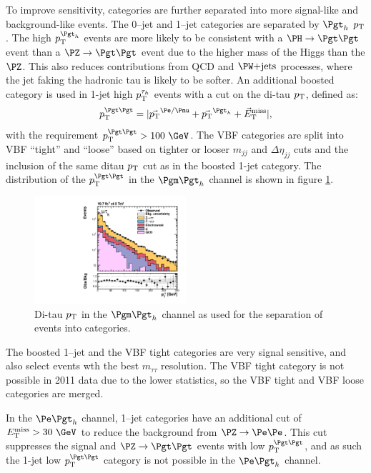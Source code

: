 To improve sensitivity, categories are further separated into more signal-like
and background-like events. The 0--jet and 1--jet categories are separated by
$\Pgth$ $p_{\mathrm{T}}$. The high $\pt^{\Pgth}$ events are more likely to be
consistent with a $\HToTauTau$ event than a $\ZToTauTau$ event due to the higher
mass of the Higgs than the $\PZ$. This also reduces contributions from \ac{QCD}
and $\WJets$ processes, where the jet faking the hadronic tau is likely to be
softer. An additional boosted category is used in 1-jet high $p_{\mathrm{T}}^{\tau_{h}}$
events with a cut on the di-tau $p_{\mathrm{T}}$, defined as:
\begin{equation}
\pt^{\Pgt\Pgt} = |\vec{\pt}^{\Pe/\Pmu} + \vec{\pt}^{\Pgth}+\vecMET|,
\end{equation}
with the requirement $\pt^{\Pgt\Pgt}>100~\GeV$. The VBF categories are split into VBF
``tight'' and ``loose'' based on tighter or looser $m_{jj}$ and
$\Delta\eta_{jj}$ cuts and the inclusion of the same ditau $p_{\mathrm{T}}$ cut as in the
boosted 1-jet category. The distribution of the $\pt^{\Pgt\Pgt}$ in the
$\mutau$ channel is shown in figure \ref{fig:ditaupt}. 

\begin{figure}[htb]
\begin{center}
    \includegraphics[width=0.5\textwidth]
      {plots/htt-sm/pt_tt_inclusive_mt_2012_log.pdf}
\end{center}
\caption{
 Di-tau $p_{\mathrm{T}}$ in the $\mutau$ channel as used for the separation of events into
 categories. 
}
\label{fig:ditaupt}
\end{figure}

The boosted 1--jet and the VBF tight categories are very 
signal sensitive, and also select events wth the best $m_{\tau\tau}$ resolution.
The VBF tight category is not possible in 2011 data due to the lower statistics,
so the VBF tight and VBF loose categories are merged. 

In the $\etau$ channel, 1--jet categories have an additional cut of $\MET >
30~\GeV$ to reduce the background from $\PZ\to\Pe\Pe$. This cut suppresses the
signal and $\ZToTauTau$ events with low $\pt^{\Pgt\Pgt}$, and as such the 1-jet low
$\pt^{\Pgt\Pgt}$ category is not possible in the $\etau$ channel. 

